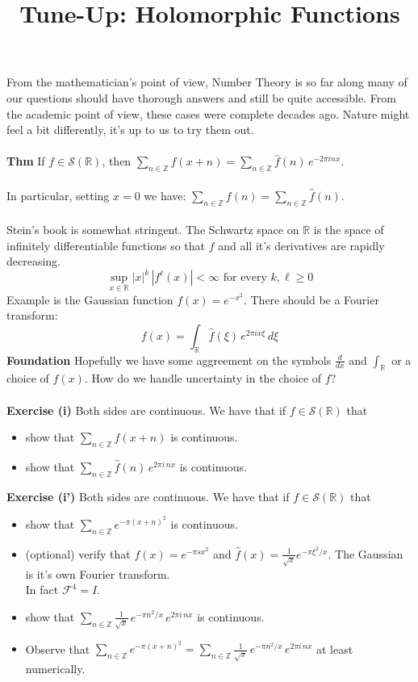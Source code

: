 \documentclass[12pt]{article}
\title{Tune-Up: Holomorphic Functions}
\date{}
\begin{document}
\sffamily

\maketitle

\noindent From the mathematician's point of view, Number Theory is so far along many of our questions should have thorough answers and still be quite accessible.  From the academic point of view, these cases were complete decades ago.  Nature might feel a bit differently, it's up to us to try them out. \\ \\
\textbf{Thm} If $f \in \mathcal{S}(\mathbb{R})$, then
$\displaystyle \sum_{n \in \mathbb{Z}} f(x+n) = \sum_{n \in \mathbb{Z}} \hat{f}(n) \, e^{- 2\pi i n x} $. \\ \\
In particular, setting $x = 0$ we have: $\displaystyle \sum_{n \in \mathbb{Z}} f(n) = \sum_{n \in \mathbb{Z}}\hat{f}(n) $. \\ \\
Stein's book is somewhat stringent.  The Schwartz space on $\mathbb{R}$ is the space of infinitely differentiable functions so that $f$ and all it's derivatives are rapidly decreasing.
$$ \sup_{x \in \mathbb{R}} |x|^k \, |f^{\ell}(x)| < \infty \text{ for every } k, \ell \geq 0 $$
Example is the Gaussian function $f(x) = e^{-x^2}$.  There should be a Fourier transform:
$$ f(x) = \int_{\mathbb{R}} \hat{f}(\xi) \, e^{2\pi i x \xi} \, d\xi $$
\textbf{Foundation} Hopefully we have some aggreement on the symbols $\frac{d}{dx}$ and $\int_{\mathbb{R}}$ or a choice of $f(x)$.   How do we handle uncertainty in the choice of $f$? \\ \\
\textbf{Exercise (i)} Both sides are continuous.  We have that if $f \in \mathcal{S}(\mathbb{R})$ that 
\begin{itemize}
\item show that $\displaystyle \sum_{n \in \mathbb{Z}} f(x+n)$ is continuous. 
\item show that $\displaystyle \sum_{n \in \mathbb{Z}} \hat{f}(n) \, e^{2\pi i \, n x}$ is continuous.
\end{itemize}
\textbf{Exercise (i')} Both sides are continuous.  We have that if $f \in \mathcal{S}(\mathbb{R})$ that 
\begin{itemize}
\item show that $\displaystyle \sum_{n \in \mathbb{Z}} e^{-\pi(x+n)^2}$ is continuous. 
\item (optional) verify that $ f(x) = e^{- \pi s x^2} $ and 
$\hat{f}(x) = \frac{1}{\sqrt{x}} e^{ - \pi \xi^2 / x } $.  The Gaussian is it's own Fourier transform. \\ 
In fact $\mathcal{F}^4 = I$.
\item show that $\displaystyle \sum_{n \in \mathbb{Z}} \frac{1}{\sqrt{x}} \, e^{- \pi n^2/x} \, e^{2\pi i \, n x}$ is continuous.
\item Observe that $\displaystyle \sum_{n \in \mathbb{Z}} e^{-\pi(x+n)^2} = \sum_{n \in \mathbb{Z}} \frac{1}{\sqrt{x}} \, e^{- \pi n^2/x} \, e^{2\pi i \, n x}$ at least numerically.
\end{itemize}
\end{document}
